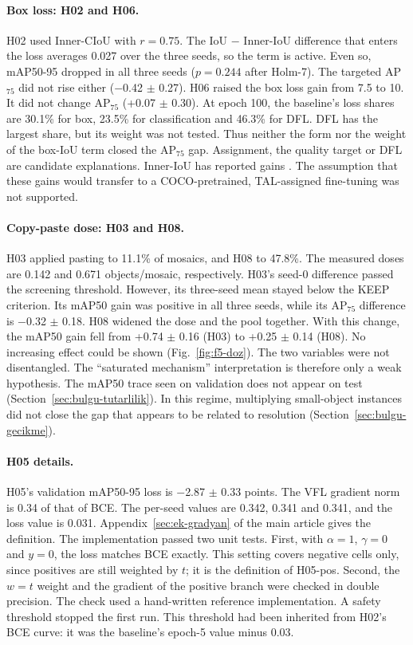 \paragraph{Box loss: H02 and H06.}
H02 used Inner-CIoU with $r=0.75$. The IoU $-$ Inner-IoU difference that enters the loss averages 0.027 over the three seeds, so the term is active. Even so, mAP50-95 dropped in all three seeds ($p=0.244$ after Holm-7). The targeted AP$_{75}$ did not rise either ($-$0.42 $\pm$ 0.27). H06 raised the box loss gain from 7.5 to 10. It did not change AP$_{75}$ (+0.07 $\pm$ 0.30). At epoch 100, the baseline's loss shares are 30.1\% for box, 23.5\% for classification and 46.3\% for DFL. DFL has the largest share, but its weight was not tested. Thus neither the form nor the weight of the box-IoU term closed the AP$_{75}$ gap. Assignment, the quality target or DFL are candidate explanations. Inner-IoU has reported gains \cite{zhang_2023_inneriou}. The assumption that these gains would transfer to a COCO-pretrained, TAL-assigned fine-tuning was not supported.

\paragraph{Copy-paste dose: H03 and H08.}
H03 applied pasting to 11.1\% of mosaics, and H08 to 47.8\%. The measured doses are 0.142 and 0.671 objects/mosaic, respectively. H03's seed-0 difference passed the screening threshold. However, its three-seed mean stayed below the KEEP criterion. Its mAP50 gain was positive in all three seeds, while its AP$_{75}$ difference is $-$0.32 $\pm$ 0.18. H08 widened the dose and the pool together. With this change, the mAP50 gain fell from +0.74 $\pm$ 0.16 (H03) to +0.25 $\pm$ 0.14 (H08). No increasing effect could be shown (Fig.~\ref{fig:f5-doz}). The two variables were not disentangled. The ``saturated mechanism'' interpretation is therefore only a weak hypothesis. The mAP50 trace seen on validation does not appear on test (Section~\ref{sec:bulgu-tutarlilik}). In this regime, multiplying small-object instances did not close the gap that appears to be related to resolution (Section~\ref{sec:bulgu-gecikme}).

\paragraph{H05 details.}
H05's validation mAP50-95 loss is $-$2.87 $\pm$ 0.33 points. The VFL gradient norm is 0.34 of that of BCE. The per-seed values are 0.342, 0.341 and 0.341, and the loss value is 0.031. Appendix~\ref{sec:ek-gradyan} of the main article gives the definition. The implementation passed two unit tests. First, with $\alpha=1$, $\gamma=0$ and $y=0$, the loss matches BCE exactly. This setting covers negative cells only, since positives are still weighted by $t$; it is the definition of H05-pos. Second, the $w=t$ weight and the gradient of the positive branch were checked in double precision. The check used a hand-written reference implementation. A safety threshold stopped the first run. This threshold had been inherited from H02's BCE curve: it was the baseline's epoch-5 value minus 0.03.

